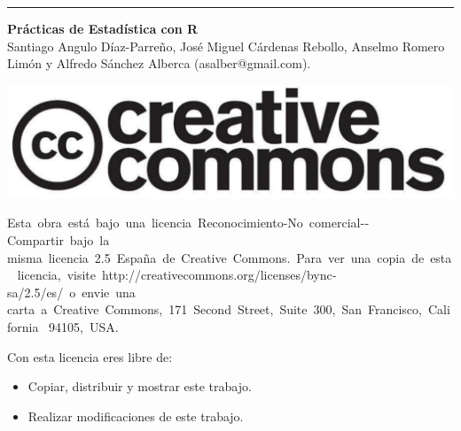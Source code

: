 \begin{titlepage}
\null
\vfill
\hrule depth 3pt
\smallskip
\sffamily

\noindent \textbf{Prácticas de Estadística con R}\\
Santiago Angulo Díaz-Parreño, José Miguel Cárdenas Rebollo, Anselmo Romero Limón y Alfredo Sánchez Alberca
(asalber@gmail.com).

\bigskip
\begin{center}
\includegraphics[scale=0.1]{img/cc-logo}
\end{center}

\small
Esta obra está bajo una licencia Reconocimiento­-No comercial-­Compartir bajo la 
misma licencia 2.5 España de Creative Commons. Para ver una copia de esta 
licencia, visite http://creativecommons.org/licenses/by­nc­sa/2.5/es/ o envie una 
carta a Creative Commons, 171 Second Street, Suite 300, San Francisco, California 
94105, USA.

\medskip
Con esta licencia eres libre de:
\begin{itemize}
\item Copiar, distribuir y mostrar este trabajo.
\item Realizar modificaciones de este trabajo.
\end{itemize}


\end{titlepage}
